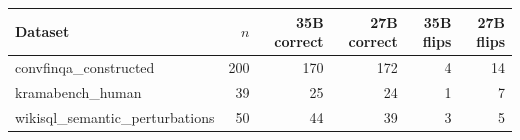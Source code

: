\begin{tabular}{lrrrrr}
\toprule
Dataset & $n$ & 35B correct & 27B correct & 35B flips & 27B flips \\
\midrule
convfinqa\_constructed & 200 & 170 & 172 & 4 & 14 \\
kramabench\_human & 39 & 25 & 24 & 1 & 7 \\
wikisql\_semantic\_perturbations & 50 & 44 & 39 & 3 & 5 \\
\bottomrule
\end{tabular}
